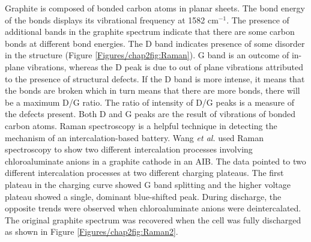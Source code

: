 Graphite is composed of  bonded carbon atoms in planar sheets. The bond energy of the  bonds displays its vibrational frequency at 1582 cm$^{-1}$. The presence of additional bands in the graphite spectrum indicate that there are some carbon bonds at different bond energies. The D band indicates presence of some disorder in the structure (Figure \ref{Figures/chap2fig:Raman}). G band is an outcome of in-plane vibrations, whereas the D peak is due to out of plane vibrations attributed to the presence of structural defects. If the D band is more intense, it means that the  bonds are broken which in turn means that there are more  bonds, there will be a maximum D/G ratio. The ratio of intensity of D/G peaks is a measure of the defects present. Both D and G peaks are the result of vibrations of  bonded carbon atoms.  
Raman spectroscopy is a helpful technique in detecting the mechanism of an intercalation-based battery. Wang \textit{et al.} used Raman spectroscopy to show two different intercalation processes involving chloroaluminate anions in a graphite cathode in an AIB. The data pointed to two different intercalation processes at two different charging plateaus. The first plateau in the charging curve showed G band splitting and the higher voltage plateau showed a single, dominant blue-shifted peak. During discharge, the opposite trends were observed when chloroaluminate anions were deintercalated. The original graphite spectrum was recovered when the cell was fully discharged\cite{wang_advanced_2017} as shown in Figure \ref{Figures/chap2fig:Raman2}. 

